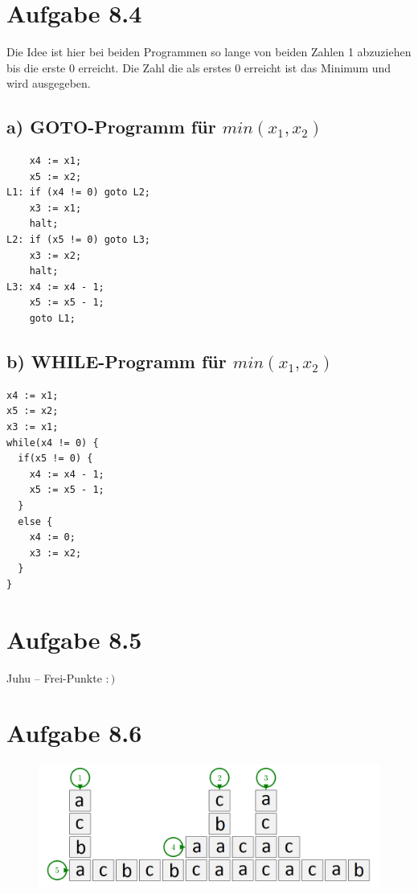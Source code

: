 \documentclass{article}
\begin{document}
\section*{Aufgabe 8.4}
Die Idee ist hier bei beiden Programmen so lange von beiden Zahlen 1 abzuziehen bis die erste 0 erreicht. Die Zahl die als erstes 0 erreicht ist das Minimum und wird ausgegeben.
\subsection*{a) GOTO-Programm für $min(x_1,x_2)$}
\begin{verbatim}
    x4 := x1;
    x5 := x2;
L1: if (x4 != 0) goto L2;
    x3 := x1;
    halt;
L2: if (x5 != 0) goto L3;
    x3 := x2;
    halt;
L3: x4 := x4 - 1;
    x5 := x5 - 1;
    goto L1;
\end{verbatim}
\newpage
\subsection*{b) WHILE-Programm für $min(x_1,x_2)$}
\begin{verbatim}
x4 := x1;
x5 := x2;
x3 := x1;
while(x4 != 0) {
  if(x5 != 0) {
    x4 := x4 - 1;
    x5 := x5 - 1;
  }
  else {
    x4 := 0;
    x3 := x2;
  }
}
\end{verbatim}
\section*{Aufgabe 8.5}

Juhu -- Frei-Punkte $:)$




\section*{Aufgabe 8.6}
\begin{figure}[!h]
  \includegraphics[scale=0.4]{crossword.png}
\end{figure}
\end{document}
